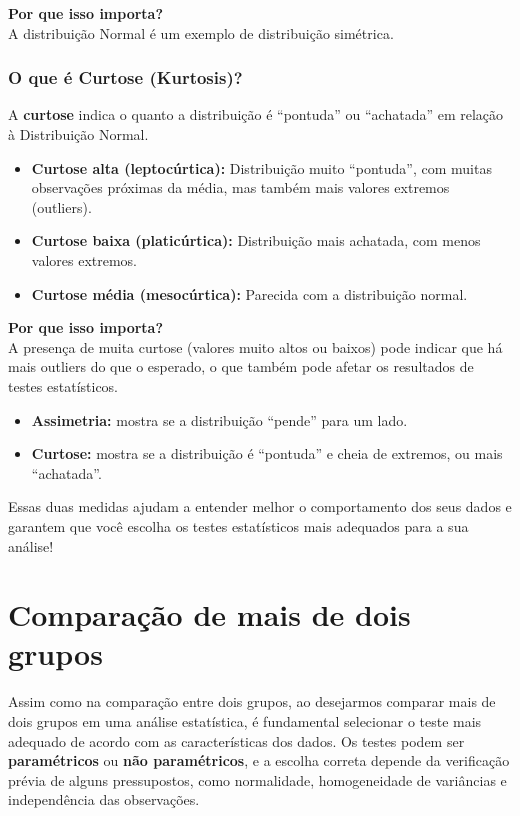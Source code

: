 \documentclass[
]{book}
\providecommand{\tightlist}{%
  \setlength{\itemsep}{0pt}\setlength{\parskip}{0pt}}
\begin{document}
\textbf{Por que isso importa?}\\
A distribuição Normal é um exemplo de distribuição simétrica.

\subsection{O que é Curtose (Kurtosis)?}\label{o-que-uxe9-curtose-kurtosis}

A \textbf{curtose} indica o quanto a distribuição é ``pontuda'' ou ``achatada'' em relação à Distribuição Normal.

\begin{itemize}
\tightlist
\item
  \textbf{Curtose alta (leptocúrtica):} Distribuição muito ``pontuda'', com muitas observações próximas da média, mas também mais valores extremos (outliers).
\item
  \textbf{Curtose baixa (platicúrtica):} Distribuição mais achatada, com menos valores extremos.
\item
  \textbf{Curtose média (mesocúrtica):} Parecida com a distribuição normal.
\end{itemize}

\textbf{Por que isso importa?}\\
A presença de muita curtose (valores muito altos ou baixos) pode indicar que há mais outliers do que o esperado, o que também pode afetar os resultados de testes estatísticos.

\begin{itemize}
\tightlist
\item
  \textbf{Assimetria:} mostra se a distribuição ``pende'' para um lado.
\item
  \textbf{Curtose:} mostra se a distribuição é ``pontuda'' e cheia de extremos, ou mais ``achatada''.
\end{itemize}

Essas duas medidas ajudam a entender melhor o comportamento dos seus dados e garantem que você escolha os testes estatísticos mais adequados para a sua análise!

\chapter{Comparação de mais de dois grupos}\label{comparauxe7uxe3o-de-mais-de-dois-grupos}

Assim como na comparação entre dois grupos, ao desejarmos comparar mais de dois grupos em uma análise estatística, é fundamental selecionar o teste mais adequado de acordo com as características dos dados. Os testes podem ser \textbf{paramétricos} ou \textbf{não paramétricos}, e a escolha correta depende da verificação prévia de alguns pressupostos, como normalidade, homogeneidade de variâncias e independência das observações.
\end{document}
